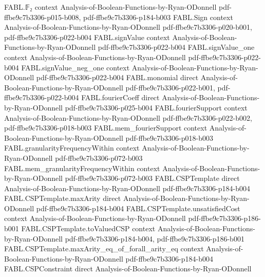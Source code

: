 \begin{theorem}
\proofstep
  {FABL.𝔽₂}
  {context}
  {Analysis-of-Boolean-Functions-by-Ryan-ODonnell}
  {pdf-ffbe9c7b3306-p015-b008,
    pdf-ffbe9c7b3306-p184-b003}
\proofstep
  {FABL.Sign}
  {context}
  {Analysis-of-Boolean-Functions-by-Ryan-ODonnell}
  {pdf-ffbe9c7b3306-p020-b001,
    pdf-ffbe9c7b3306-p022-b004}
\proofstep
  {FABL.signValue}
  {context}
  {Analysis-of-Boolean-Functions-by-Ryan-ODonnell}
  {pdf-ffbe9c7b3306-p022-b004}
\proofstep
  {FABL.signValue_one}
  {context}
  {Analysis-of-Boolean-Functions-by-Ryan-ODonnell}
  {pdf-ffbe9c7b3306-p022-b004}
\proofstep
  {FABL.signValue_neg_one}
  {context}
  {Analysis-of-Boolean-Functions-by-Ryan-ODonnell}
  {pdf-ffbe9c7b3306-p022-b004}
\proofstep
  {FABL.monomial}
  {direct}
  {Analysis-of-Boolean-Functions-by-Ryan-ODonnell}
  {pdf-ffbe9c7b3306-p022-b001,
    pdf-ffbe9c7b3306-p022-b004}
\proofstep
  {FABL.fourierCoeff}
  {direct}
  {Analysis-of-Boolean-Functions-by-Ryan-ODonnell}
  {pdf-ffbe9c7b3306-p025-b004}
\proofstep
  {FABL.fourierSupport}
  {context}
  {Analysis-of-Boolean-Functions-by-Ryan-ODonnell}
  {pdf-ffbe9c7b3306-p022-b002,
    pdf-ffbe9c7b3306-p018-b003}
\proofstep
  {FABL.mem_fourierSupport}
  {context}
  {Analysis-of-Boolean-Functions-by-Ryan-ODonnell}
  {pdf-ffbe9c7b3306-p018-b003}
\proofstep
  {FABL.granularityFrequencyWithin}
  {context}
  {Analysis-of-Boolean-Functions-by-Ryan-ODonnell}
  {pdf-ffbe9c7b3306-p072-b003}
\proofstep
  {FABL.mem_granularityFrequencyWithin}
  {context}
  {Analysis-of-Boolean-Functions-by-Ryan-ODonnell}
  {pdf-ffbe9c7b3306-p072-b003}
\proofstep
  {FABL.CSPTemplate}
  {direct}
  {Analysis-of-Boolean-Functions-by-Ryan-ODonnell}
  {pdf-ffbe9c7b3306-p184-b004}
\proofstep
  {FABL.CSPTemplate.maxArity}
  {direct}
  {Analysis-of-Boolean-Functions-by-Ryan-ODonnell}
  {pdf-ffbe9c7b3306-p184-b004}
\proofstep
  {FABL.CSPTemplate.unsatisfiedCost}
  {context}
  {Analysis-of-Boolean-Functions-by-Ryan-ODonnell}
  {pdf-ffbe9c7b3306-p186-b001}
\proofstep
  {FABL.CSPTemplate.toValuedCSP}
  {context}
  {Analysis-of-Boolean-Functions-by-Ryan-ODonnell}
  {pdf-ffbe9c7b3306-p184-b004,
    pdf-ffbe9c7b3306-p186-b001}
\proofstep
  {FABL.CSPTemplate.maxArity_eq_of_forall_arity_eq}
  {context}
  {Analysis-of-Boolean-Functions-by-Ryan-ODonnell}
  {pdf-ffbe9c7b3306-p184-b004}
\proofstep
  {FABL.CSPConstraint}
  {direct}
  {Analysis-of-Boolean-Functions-by-Ryan-ODonnell}

\end{theorem}
